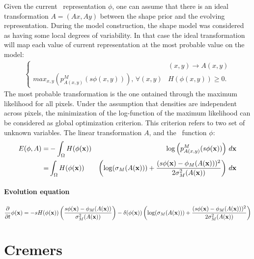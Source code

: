 Given the current \ls~representation $\phi$, one can assume that there is an ideal transformation $A = (Ax, Ay)$ between the shape prior and the evolving representation. During the model construction, the shape model was considered as having some local degrees of variability. In that case the ideal transformation will map each value of current representation at the most probable value on the model:
\begin{align}
  \label{eq:Transform-rousson}
  \begin{cases}
    \nonumber & (x,y) \rightarrow A(x,y) \\
    max_{x,y}\left(p_{A(x,y)}^M(s\phi(x,y))\right), \, \forall (x,y) & H(\phi(x,y)) \geq 0.
  \end{cases}
\end{align}
The most probable transformation is the one ontained through the maximum likelihood for all pixels. Under the assumption that densities are independent across pixels, the minimization of the log-function of the maximum likelihood can be considered as global optimization criterion. This criterion refers to two set of unknown variables. The linear transformation $A$, and the \ls~function $\phi$:
\begin{eqnarray}
  \label{eq:NRJ-rousson}
  \nonumber E(\phi,A) = & -\int_\Omega H(\phi(\mathbf{x})) & \log \left( p_{A(x,y)}^M(s\phi(\mathbf{x})) \right) \, d\mathbf{x} \\
  = & \int_\Omega H(\phi(\mathbf{x})) & \left( \log(\sigma_M(A(\mathbf{x}))) + \dfrac{(s\phi(\mathbf{x}) - \phi_M(A(\mathbf{x})))^2}{2\sigma_M^2(A(\mathbf{x}))}\right) \, d\mathbf{x}
\end{eqnarray}


\paragraph{Evolution equation}
\begin{equation}
  \label{eq:dphidt-rousson}
  \frac{\partial}{\partial t}\phi(\mathbf{x}) = -sH(\phi(\mathbf{x}))\left(\frac{s\phi(\mathbf{x}) - \phi_M(A(\mathbf{x}))}{\sigma_M^2(A(\mathbf{x}))} \right) - \delta(\phi(\mathbf{x}))\left(\log(\sigma_M(A(\mathbf{x}))) + \frac{(s\phi(\mathbf{x}) - \phi_M(A(\mathbf{x})))^2}{2\sigma_M^2(A(\mathbf{x}))} \right)
\end{equation}



\newpage
\section[Cremers \etal]{Cremers  \cite{Cremers2003b}}
\label{sec:shape-cremers2003b}

